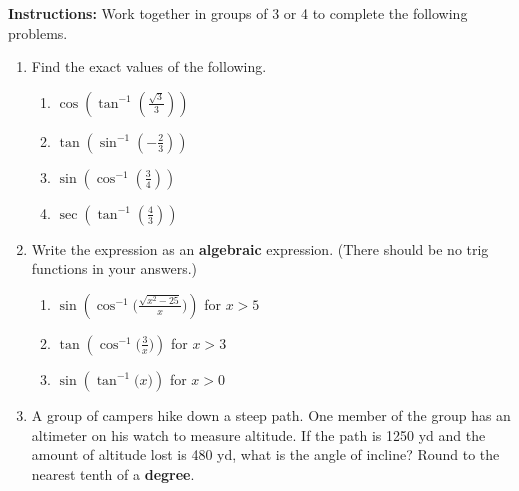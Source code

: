 


\noindent \textbf{Instructions:}  Work together in groups of  3 or 4 to complete the following problems.\\

\begin{enumerate}

\item Find the exact values of the following.
\begin{enumerate}

\item $\cos \left( \tan^{-1}(\frac{\sqrt{3}}{3})\right)$

\vfill
\item $\tan \left( \sin^{-1}(-\frac{2}{3})\right)$


\vfill

\item $\sin \left( \cos^{-1}(\frac{3}{4})\right)$
\vfill

\item $\sec \left( \tan^{-1}(\frac{4}{3})\right)$
\vfill

\end{enumerate}



\newpage
\item Write the expression as an \textbf{algebraic} expression.  (There should be no trig functions in your answers.)

\begin{enumerate}

\item $\displaystyle \sin \left( \cos^{-1}\Big(\frac{\sqrt{x^2-25}}{x}\Big)\right)$ for $x>5$

\vfill

\item $\displaystyle \tan \left( \cos^{-1}\Big(\frac{3}{x}\Big)\right)$ for $x>3$
\vfill

\item $\displaystyle \sin \left( \tan^{-1}\Big(x\Big)\right)$ for $x>0$
\vfill


\end{enumerate}


\newpage

\item A group of campers hike down a steep path.  One member of the group has an altimeter on his watch to measure altitude.  If the path is 1250 yd and the amount of altitude lost is 480 yd, what is the angle of incline?  Round to the nearest tenth of a \textbf{degree}.
\vfill


\end{enumerate}
